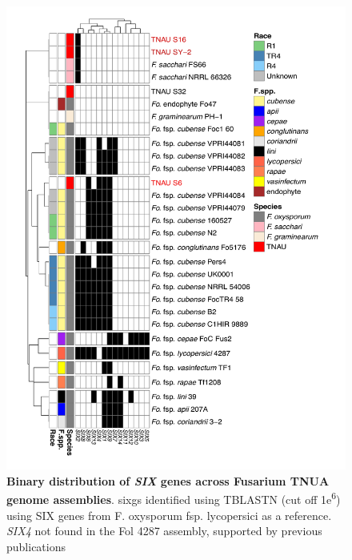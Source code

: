 \begin{figure}[htp!]
  \centering
  \includegraphics[width=15cm]{Figures/Heatmap.pdf}
  \caption[Binary distribution of \textit{SIX} genes across Fusarium TNUA genome assemblies]{\textbf{Binary distribution of \textit{SIX} genes across Fusarium TNUA genome assemblies}. \aclp{sixg} identified using TBLASTN (cut off 1\-e\textsuperscript{6}) using SIX genes from F. oxysporum fsp. lycopersici as a reference. \textit{SIX4} not found in the \acl{Fol} 4287 assembly, supported by previous publications \parencite{Czislowski2018}}
  \label{fig:SixTNAU}
\end{figure}

